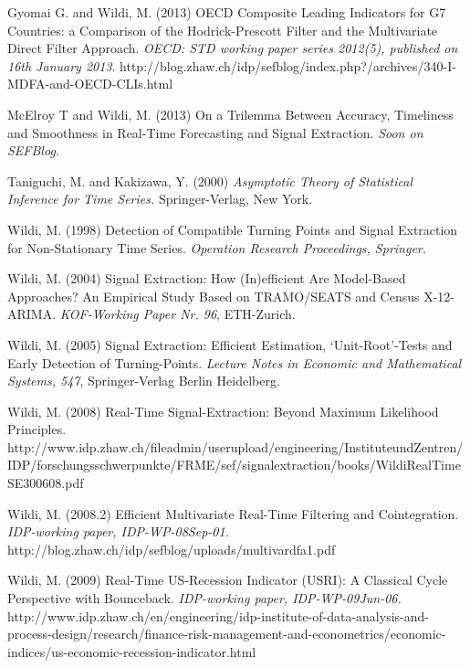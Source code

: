 \documentclass[11pt]{article}
\begin{document}
\begin{thebibliography}{99}

\bibitem{} Gyomai G. and Wildi, M. (2013) OECD Composite Leading Indicators for G7 Countries: a Comparison of the Hodrick-Prescott Filter and the Multivariate Direct Filter Approach. {\it OECD: STD working paper series 2012(5), published on 16th January 2013}.
http://blog.zhaw.ch/idp/sefblog/index.php?/archives/340-I-MDFA-and-OECD-CLIs.html


\bibitem{} McElroy T and Wildi, M. (2013)  On a Trilemma Between Accuracy, Timeliness and Smoothness
in Real-Time Forecasting and Signal Extraction. {\it
Soon on SEFBlog.}

\bibitem{} Taniguchi, M. and Kakizawa, Y. (2000) {\it Asymptotic Theory of Statistical
Inference for Time Series.} Springer-Verlag, New York.

\bibitem{} Wildi, M. (1998)  Detection of Compatible Turning Points and Signal Extraction for Non-Stationary Time Series. {\it
Operation Research Proceedings, Springer.}



\bibitem{} Wildi, M. (2004)  Signal Extraction: How (In)efficient Are Model-Based Approaches?
An Empirical Study Based on TRAMO/SEATS and Census X-12-ARIMA. {\it
KOF-Working Paper Nr. 96}, ETH-Zurich.



\bibitem{} Wildi, M. (2005)  Signal Extraction: Efficient Estimation, `Unit-Root'-Tests and Early Detection of Turning-Points.
{\it Lecture Notes in Economic and Mathematical Systems, 547}, Springer-Verlag Berlin Heidelberg.
%

\bibitem{} Wildi, M. (2008) Real-Time Signal-Extraction: Beyond Maximum Likelihood
Principles.
http://www.idp.zhaw.ch/fileadmin/user\textunderscore upload/engineering/\textunderscore Institute\textunderscore und\textunderscore Zentren/IDP/forschungsschwerpunkte/FRME/sef/signalextraction/books/Wildi\textunderscore Real\textunderscore Time\textunderscore SE\textunderscore 300608.pdf


\bibitem{} Wildi, M. (2008.2) Efficient Multivariate Real-Time Filtering and
Cointegration. {\it IDP-working paper, IDP-WP-08Sep-01.}
http://blog.zhaw.ch/idp/sefblog/uploads/multivar\textunderscore dfa1.pdf


\bibitem{} Wildi, M. (2009) Real-Time US-Recession Indicator (USRI):
A Classical Cycle Perspective with Bounceback. {\it IDP-working paper, IDP-WP-09Jun-06.}
http://www.idp.zhaw.ch/en/engineering/idp-institute-of-data-analysis-and-process-design/research/finance-risk-management-and-econometrics/economic-indices/us-economic-recession-indicator.html


\end{thebibliography}
\end{document}
